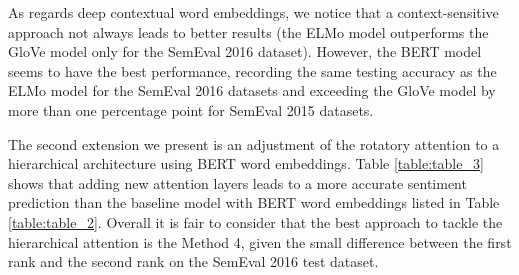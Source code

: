 \documentclass[hidelinks]{llncs}
\begin{document}
\begin{table}[htp]
\footnotesize{}
\centering

\setlength{\tabcolsep}{5pt} \caption{\footnotesize {Comparison between HAABSA++ (Method 4) with state-of-the-art models in SC task using accuracy. SW stands for the SemEval Winner (the most effective result reported in the SemEval contest). The best results are given in bold font.}}
\label{table:table_4}
\vspace{-0.7cm}
\end{table}

As regards deep contextual word embeddings, we notice that a context-sensitive approach not always leads to better results (the ELMo model outperforms the GloVe model only for the SemEval 2016 dataset). However, the BERT model seems to have the best performance, recording the same testing accuracy as the ELMo model for the SemEval 2016 datasets and exceeding the GloVe model by more than one percentage point for SemEval 2015 datasets.

The second extension we present is an adjustment of the rotatory attention to a hierarchical architecture using BERT word embeddings. Table \ref{table:table_3} shows that adding new attention layers leads to a more accurate sentiment prediction than the baseline model with BERT word embeddings listed in Table \ref{table:table_2}. Overall it is fair to consider that the best approach to tackle the hierarchical attention is the Method 4, given the small difference between the first rank and the second rank on the SemEval 2016 test dataset. 
\end{document}
